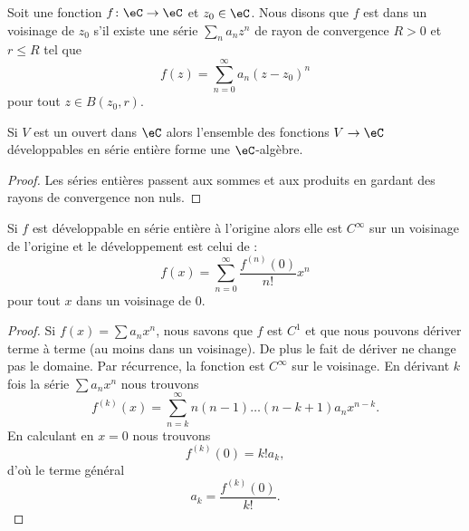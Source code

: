\begin{definition}  \label{DefwmRzKh}
    Soit une fonction \( f\colon \eC\to \eC\) et \( z_0\in \eC\). Nous disons que \( f\)
    est  dans un
    voisinage de \( z_0\) s'il existe une série \( \sum_n a_nz^n\) de rayon de convergence \( R>0\) et \( r\leq R\) tel que
    \begin{equation}
        f(z)=\sum_{n=0}^{\infty}a_n(z-z_0)^n
    \end{equation}
    pour tout \( z\in B(z_0,r)\).
\end{definition}

\begin{proposition}
    Si \( V\) est un ouvert dans \( \eC\) alors l'ensemble des fonctions \( V\to \eC\) développables en série entière forme une \( \eC\)-algèbre.
\end{proposition}

\begin{proof}
    Les séries entières passent aux sommes et aux produits en gardant des rayons de convergence non nuls.
\end{proof}

\begin{proposition} \label{ThoTGPtDj}
    Si \( f\) est développable en série entière à l'origine alors elle est \( C^{\infty}\) sur un voisinage de l'origine et le développement est celui de  :
    \begin{equation}
        f(x)=\sum_{n=0}^{\infty}\frac{ f^{(n)}(0) }{ n! }x^n
    \end{equation}
    pour tout \( x\) dans un voisinage de \( 0\).
\end{proposition}

\begin{proof}
    Si \( f(x)=\sum a_nx^n\), nous savons que \( f\) est \( C^1\) et que nous pouvons dériver terme à terme (au moins dans un voisinage). De plus le fait de dériver ne change pas le domaine. Par récurrence, la fonction est \( C^{\infty}\) sur le voisinage. En dérivant \( k\) fois la série \( \sum a_nx^n\) nous trouvons
    \begin{equation}
        f^{(k)}(x)=\sum_{n=k}^{\infty}n(n-1)\ldots (n-k+1)a_nx^{n-k}.
    \end{equation}
    En calculant en \( x=0\) nous trouvons
    \begin{equation}
        f^{(k)}(0)=k! a_k,
    \end{equation}
    d'où le terme général
    \begin{equation}
        a_k=\frac{ f^{(k)}(0) }{ k! }.
    \end{equation}
\end{proof}

